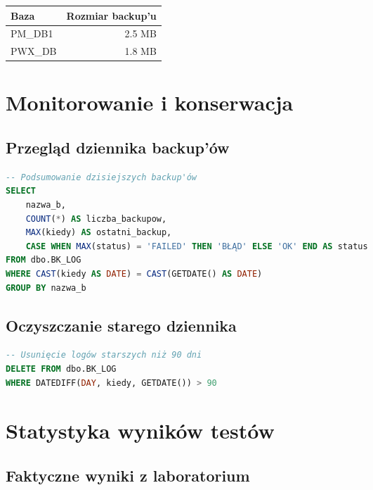 \documentclass[a4paper,11pt]{article}
\begin{document}
	\begin{center}
		\begin{tabular}{|l|r|}
			\hline
			\textbf{Baza} & \textbf{Rozmiar backup'u} \\
			\hline
			PM\_DB1 & ~2.5 MB \\
			\hline
			PWX\_DB & ~1.8 MB \\
			\hline
		\end{tabular}
	\end{center}
	
	\section{Monitorowanie i konserwacja}
	
	\subsection{Przegląd dziennika backup'ów}
	
	\begin{lstlisting}[language=SQL]
-- Podsumowanie dzisiejszych backup'ów
SELECT 
	nazwa_b, 
	COUNT(*) AS liczba_backupow,
	MAX(kiedy) AS ostatni_backup,
	CASE WHEN MAX(status) = 'FAILED' THEN 'BŁĄD' ELSE 'OK' END AS status
FROM dbo.BK_LOG
WHERE CAST(kiedy AS DATE) = CAST(GETDATE() AS DATE)
GROUP BY nazwa_b
	\end{lstlisting}
	
	\subsection{Oczyszczanie starego dziennika}
	
	\begin{lstlisting}[language=SQL]
-- Usunięcie logów starszych niż 90 dni
DELETE FROM dbo.BK_LOG
WHERE DATEDIFF(DAY, kiedy, GETDATE()) > 90
	\end{lstlisting}
	
	\section{Statystyka wyników testów}
	
	\subsection{Faktyczne wyniki z laboratorium}
	
\end{document}
